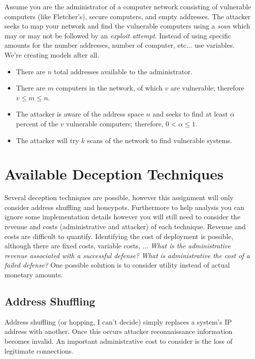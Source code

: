 \documentclass[10pt]{article}
\begin{document}
Assume you are the administrator of a computer network consisting of vulnerable computers (like Fletcher's), secure computers, and empty addresses. The attacker seeks to map your network and find the vulnerable computers using a \textit{scan} which may or may not be followed by an \textit{exploit attempt}. Instead of using specific amounts for the number addresses, number of computer, etc... use  variables. We're creating models after all.

\begin{itemize}
   \item There are $n$ total addresses available to the administrator.
   \item There are $m$ computers in the network, of which $v$ are vulnerable; therefore $v \leq m \leq n$.
   \item The attacker is aware of the address space $n$ and seeks to find at least  $\alpha$ percent of the $v$ vulnerable computers; therefore, $0 < \alpha \leq 1$.
   \item The attacker will try $k$ scans of the network to find vulnerable systems.
\end{itemize}

\section*{Available Deception Techniques}

Several deception techniques are possible, however this assignment will only consider address shuffling and honeypots. Furthermore to help analysis you can ignore some implementation details however you will still need to consider the revenue and costs (administrative and attacker) of each technique. Revenue and costs are difficult to quantify. Identifying the cost of deployment is possible, although there are fixed costs, variable costs, ... \textit{What is the administrative revenue associated with a successful defense?} \textit{What is administrative the cost of a failed defense?} One possible solution is to consider utility instead of actual monetary amounts.

\subsection*{Address Shuffling}

Address shuffling (or hopping, I can't decide) simply replaces a system's IP address with another. Once this occurs attacker reconnaissance information becomes invalid. An important administrative cost to consider is the loss of legitimate connections.
\end{document}
